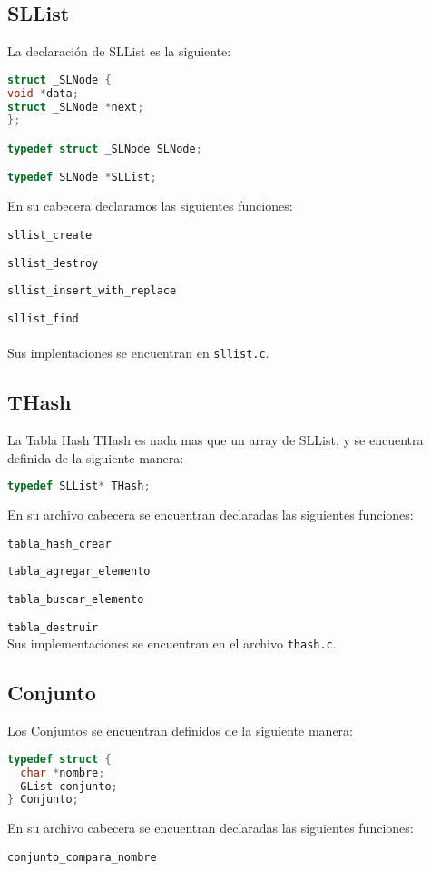 \documentclass[]{article}
\begin{document}
\subsection{SLList}
La declaración de SLList es la siguiente:

\begin{lstlisting}[language=C]
struct _SLNode {
void *data;
struct _SLNode *next;
};

typedef struct _SLNode SLNode;

typedef SLNode *SLList;
\end{lstlisting}
En su cabecera declaramos las siguientes funciones:

\verb|sllist_create|

\verb|sllist_destroy|

\verb|sllist_insert_with_replace|

\verb|sllist_find|\\\\
Sus implentaciones se encuentran en \verb|sllist.c|.
\newpage
\subsection{THash}
La Tabla Hash THash es nada mas que un array de SLList, y se encuentra definida de la siguiente manera:

\begin{lstlisting}[language=C]
typedef SLList* THash;
\end{lstlisting}
En su archivo cabecera se encuentran declaradas las siguientes funciones:

\verb|tabla_hash_crear|

\verb|tabla_agregar_elemento|

\verb|tabla_buscar_elemento|

\verb|tabla_destruir|\\
Sus implementaciones se encuentran en el archivo \verb|thash.c|.

\subsection{Conjunto}
Los Conjuntos se encuentran definidos de la siguiente manera:

\begin{lstlisting}[language=C]
typedef struct {
  char *nombre;
  GList conjunto;
} Conjunto;
\end{lstlisting}
En su archivo cabecera se encuentran declaradas las siguientes funciones:

\verb|conjunto_compara_nombre|
\end{document}
